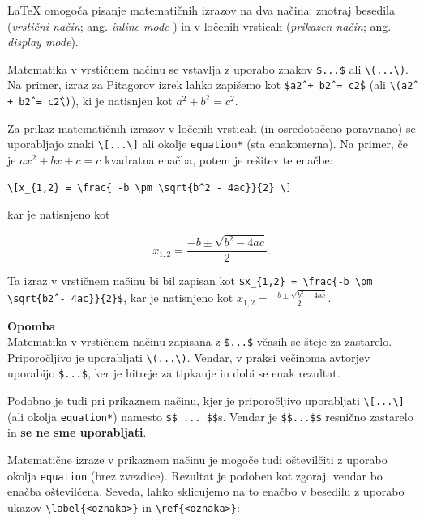 LaTeX omogoča pisanje matematičnih izrazov na dva načina: znotraj besedila (\textit{vrstični način}; ang. \textit{inline mode} ) in v ločenih vrsticah (\textit{prikazen način}; ang. \textit{display mode}).

Matematika v vrstičnem načinu se vstavlja z uporabo znakov \texttt{\$...\$} ali \texttt{{\textbackslash}(...{\textbackslash})}. Na primer, izraz za Pitagorov izrek lahko zapišemo kot \texttt{\$a\^2 + b\^2 = c\^2\$} (ali \texttt{{\textbackslash}(a\^2 + b\^2 = c\^2{\textbackslash})}), ki je natisnjen kot $a^2 + b^2 = c^2$.

Za prikaz matematičnih izrazov v ločenih vrsticah (in osredotočeno poravnano) se uporabljajo znaki \texttt{{\textbackslash}[...{\textbackslash}]} ali okolje \texttt{equation*} (sta enakomerna). Na primer, če je $ax^2 + bx +c = c$ kvadratna enačba, potem je rešitev te enačbe:

\begin{verbatim}
\[x_{1,2} = \frac{ -b \pm \sqrt{b^2 - 4ac}}{2} \]
\end{verbatim}

kar je natisnjeno kot

\begin{equation}
x_{1,2} = \frac{-b \pm \sqrt{b^2 - 4ac}}{2}.
\end{equation}

Ta izraz v vrstičnem načinu bi bil zapisan kot \texttt{\$x\_\{1,2\} = {\textbackslash}frac\{-b {\textbackslash}pm {\textbackslash}sqrt\{b\^2 - 4ac\}\}\{2\}\$}, kar je natisnjeno kot $x_{1,2} = \frac{ -b \pm \sqrt{b^2 - 4ac}}{2}$.

\begin{framed}
\textbf{Opomba}\\
Matematika v vrstičnem načinu zapisana z \texttt{\$...\$} včasih se šteje za zastarelo. Priporočljivo je uporabljati \texttt{{\textbackslash}(...{\textbackslash})}. Vendar, v praksi večinoma avtorjev uporabijo \texttt{\$...\$}, ker je hitreje za tipkanje in dobi se enak rezultat.

Podobno je tudi pri prikaznem načinu, kjer je priporočljivo uporabljati \texttt{{\textbackslash}[...{\textbackslash}]} (ali okolja \texttt{equation*}) namesto \texttt{\$\$ ... \$\$}s. Vendar je \texttt{\$\$...\$\$} resnično zastarelo in \textbf{se ne sme uporabljati}.
\end{framed}

Matematične izraze v prikaznem načinu je mogoče tudi oštevilčiti z uporabo okolja \texttt{equation} (brez zvezdice). Rezultat je podoben kot zgoraj, vendar bo enačba oštevilčena. Seveda, lahko sklicujemo na to enačbo v besedilu z uporabo ukazov \texttt{{\textbackslash}label\{\textless oznaka\textgreater \}} in \texttt{{\textbackslash}ref\{\textless oznaka\textgreater \}}:

